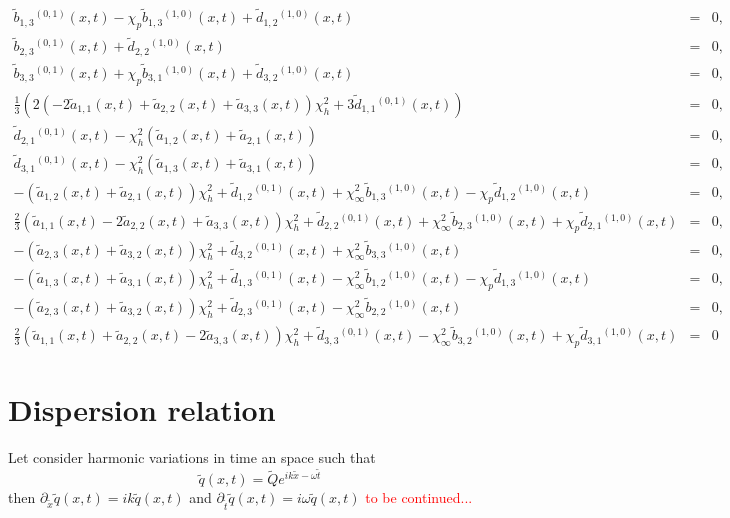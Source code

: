 \documentclass[
10pt, %
a4paper, %
oneside, %
headinclude,footinclude, %
table
]{scrartcl}
\begin{document}
$$\begin{array}{rcl}
%
   \tilde{b}_{1,3}{}^{(0,1)}(x,t)-\chi _p \tilde{b}_{1,3}{}^{(1,0)}(x,t)+\tilde{d}_{1,2}{}^{(1,0)}(x,t)&=&0,\\
%
   \tilde{b}_{2,3}{}^{(0,1)}(x,t)+\tilde{d}_{2,2}{}^{(1,0)}(x,t)&=&0,\\
%
   \tilde{b}_{3,3}{}^{(0,1)}(x,t)+\chi _p \tilde{b}_{3,1}{}^{(1,0)}(x,t)+\tilde{d}_{3,2}{}^{(1,0)}(x,t)&=&0,\\
%
   \frac{1}{3} \left(2 \left(-2 \tilde{a}_{1,1}(x,t)+\tilde{a}_{2,2}(x,t)+\tilde{a}_{3,3}(x,t)\right) \chi_h^2+3 \tilde{d}_{1,1}{}^{(0,1)}(x,t)\right)&=&0,\\
%
   \tilde{d}_{2,1}{}^{(0,1)}(x,t)-\chi _h^2\left(\tilde{a}_{1,2}(x,t)+\tilde{a}_{2,1}(x,t)\right)&=&0,\\
%
      \tilde{d}_{3,1}{}^{(0,1)}(x,t)-\chi _h^2 \left(\tilde{a}_{1,3}(x,t)+\tilde{a}_{3,1}(x,t)\right)&=&0,\\
%
   -\left(\tilde{a}_{1,2}(x,t)+\tilde{a}_{2,1}(x,t)\right) \chi_h^2+\tilde{d}_{1,2}{}^{(0,1)}(x,t)+\chi _{\infty }^2\tilde{b}_{1,3}{}^{(1,0)}(x,t)-\chi_p\tilde{d}_{1,2}{}^{(1,0)}(x,t)&=&0,\\
%
   \frac{2}{3}\left(\tilde{a}_{1,1}(x,t)-2\tilde{a}_{2,2}(x,t)+\tilde{a}_{3,3}(x,t)\right) \chi_h^2+\tilde{d}_{2,2}{}^{(0,1)}(x,t)+\chi _{\infty }^2\tilde{b}_{2,3}{}^{(1,0)}(x,t)+\chi_p\tilde{d}_{2,1}{}^{(1,0)}(x,t)&=&0,\\
%
   -\left(\tilde{a}_{2,3}(x,t)+\tilde{a}_{3,2}(x,t)\right) \chi _h^2+\tilde{d}_{3,2}{}^{(0,1)}(x,t)+\chi_{\infty }^2\tilde{b}_{3,3}{}^{(1,0)}(x,t)&=&0,\\
%
   -\left(\tilde{a}_{1,3}(x,t)+\tilde{a}_{3,1}(x,t)\right) \chi _h^2+\tilde{d}_{1,3}{}^{(0,1)}(x,t)-\chi_{\infty }^2 \tilde{b}_{1,2}{}^{(1,0)}(x,t)-\chi _p\tilde{d}_{1,3}{}^{(1,0)}(x,t)&=&0,\\
%
   -\left(\tilde{a}_{2,3}(x,t)+\tilde{a}_{3,2}(x,t)\right) \chi _h^2+\tilde{d}_{2,3}{}^{(0,1)}(x,t)-\chi_{\infty }^2 \tilde{b}_{2,2}{}^{(1,0)}(x,t)&=&0,\\
%
   \frac{2}{3}\left(\tilde{a}_{1,1}(x,t)+\tilde{a}_{2,2}(x,t)-2\tilde{a}_{3,3}(x,t)\right) \chi_h^2+\tilde{d}_{3,3}{}^{(0,1)}(x,t)-\chi _{\infty }^2\tilde{b}_{3,2}{}^{(1,0)}(x,t)+\chi _p\tilde{d}_{3,1}{}^{(1,0)}(x,t)&=&0
   \end{array}
   $$
\section{Dispersion relation}
Let consider harmonic variations in time an space such that 
$$
\tilde{q}(x,t)=\tilde{Q}e^{ik\tilde{x}-\omega \tilde{t}}
$$
then $\partial_{\tilde{x}}\tilde{q}(x,t)=ik\tilde{q}(x,t)$ and $\partial_{\tilde{t}}\tilde{q}(x,t)=i\omega\tilde{q}(x,t)$
\textcolor{red}{to be continued...}
   
\end{document}
